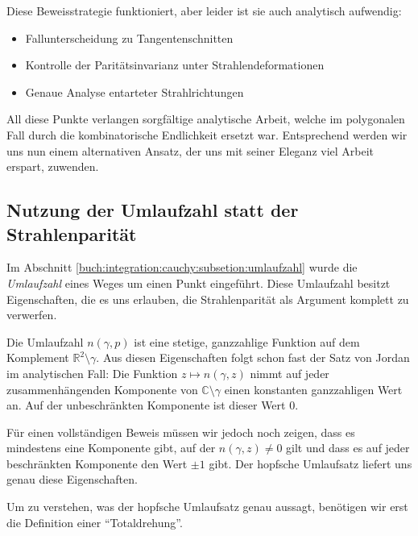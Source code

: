 Diese Beweisstrategie funktioniert, aber leider ist sie auch analytisch aufwendig:

\begin{itemize}
    \item Fallunterscheidung zu Tangentenschnitten
    \item Kontrolle der Paritätsinvarianz unter Strahlendeformationen
    \item Genaue Analyse entarteter Strahlrichtungen
\end{itemize}

All diese Punkte verlangen sorgfältige analytische Arbeit, welche im polygonalen Fall durch die kombinatorische Endlichkeit ersetzt war. 
Entsprechend werden wir uns nun einem alternativen Ansatz, der uns mit seiner Eleganz viel Arbeit erspart, zuwenden. 

\subsection{Nutzung der Umlaufzahl statt der Strahlenparität}

Im Abschnitt \ref{buch:integration:cauchy:subsetion:umlaufzahl} wurde die \emph{Umlaufzahl} eines Weges um einen Punkt eingeführt. 
%
Diese Umlaufzahl besitzt Eigenschaften, die es uns erlauben, die Strahlenparität als Argument komplett zu verwerfen. 



Die Umlaufzahl $n(\gamma, p)$ ist eine stetige, ganzzahlige Funktion auf dem Komplement $\mathbb{R}^2 \setminus \gamma$. 
Aus diesen Eigenschaften folgt schon fast der Satz von Jordan im analytischen Fall: Die Funktion $z \mapsto n(\gamma, z)$ nimmt auf jeder zusammenhängenden Komponente von $\mathbb{C} \setminus \gamma$ einen konstanten ganzzahligen Wert an. 
Auf der unbeschränkten Komponente ist dieser Wert $0$. 

Für einen vollständigen Beweis müssen wir jedoch noch zeigen, dass es mindestens eine Komponente gibt, auf der $n(\gamma, z) \neq 0$ gilt und dass es auf jeder beschränkten Komponente den Wert $\pm 1$ gibt.
Der hopfsche Umlaufsatz liefert uns genau diese Eigenschaften.



Um zu verstehen, was der hopfsche Umlaufsatz genau aussagt, benötigen wir erst die Definition einer ``Totaldrehung''.



